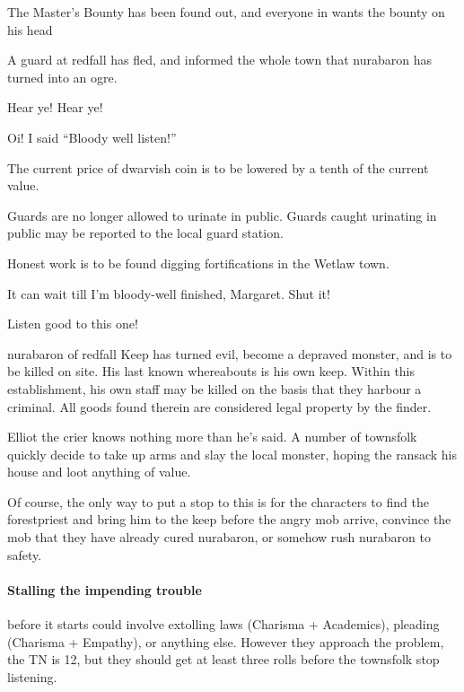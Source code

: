 \begin{multicols}{2}

{\N \N The Master's Bounty}%
{ has been found out, and everyone in  wants the bounty on his head}%

A guard at \gls{redfall} has fled, and informed the whole town that \gls{nurabaron} has turned into an ogre.

\begin{speechtext}

    Hear ye! Hear ye!

    Oi! I said ``Bloody well listen!''

    The current price of dwarvish coin is to be lowered by a tenth of the current value.

    Guards are no longer allowed to urinate in public.
    Guards caught urinating in public may be reported to the local guard station.

    Honest work is to be found digging fortifications in the Wetlaw town.

    It can wait till I'm bloody-well finished, Margaret.  Shut it!

    Listen good to this one!

    \gls{nurabaron} of \gls{redfall} Keep has turned evil, become a depraved monster, and is to be killed on site.  His last known whereabouts is his own keep.  Within this establishment, his own staff may be killed on the basis that they harbour a criminal.  All goods found therein are considered legal property by the finder.

\end{speechtext}

Elliot the crier knows nothing more than he's said.  A number of townsfolk quickly decide to take up arms and slay the local monster, hoping the ransack his house and loot anything of value.

Of course, the only way to put a stop to this is for the characters to find the \gls{forestpriest} and bring him to the keep before the angry mob arrive, convince the mob that they have already cured \gls{nurabaron}, or somehow rush \gls{nurabaron} to safety.

\paragraph{Stalling the impending trouble}
before it starts could involve extolling laws (Charisma + Academics), pleading (Charisma + Empathy), or anything else.
However they approach the problem, the TN is 12, but they should get at least three rolls before the townsfolk stop listening.


\end{multicols}
